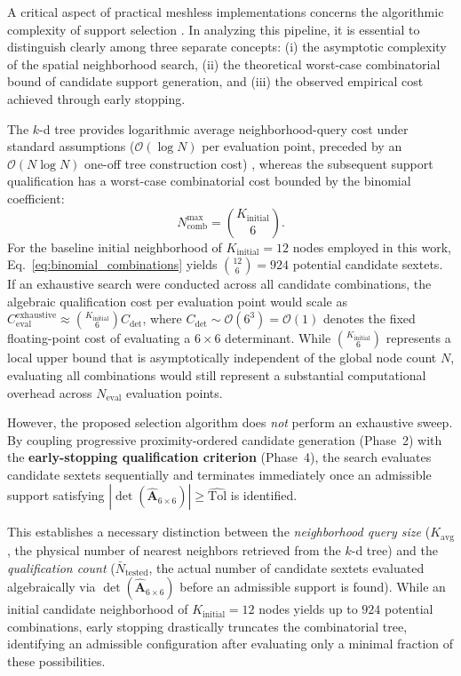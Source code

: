 \documentclass[preprint,12pt]{elsarticle}
\begin{document}
A critical aspect of practical meshless implementations concerns the algorithmic complexity of support selection \cite{slak2018refined,parreira2006efficient,wu2026high}. In analyzing this pipeline, it is essential to distinguish clearly among three separate concepts: (i) the asymptotic complexity of the spatial neighborhood search, (ii) the theoretical worst-case combinatorial bound of candidate support generation, and (iii) the observed empirical cost achieved through early stopping.

The $k$-d tree provides logarithmic average neighborhood-query cost under standard assumptions ($\mathcal{O}(\log N)$ per evaluation point, preceded by an $\mathcal{O}(N \log N)$ one-off tree construction cost) \cite{bentley1975multidimensional, parreira2006efficient, fasshauer2007meshfree,wu2026high}, whereas the subsequent support qualification has a worst-case combinatorial cost bounded by the binomial coefficient:
\begin{equation}
    N_{\mathrm{comb}}^{\mathrm{max}} = \binom{K_{\mathrm{initial}}}{6}.
    \label{eq:binomial_combinations}
\end{equation}
For the baseline initial neighborhood of $K_{\mathrm{initial}} = 12$ nodes employed in this work, Eq.~\eqref{eq:binomial_combinations} yields $\binom{12}{6} = 924$ potential candidate sextets. If an exhaustive search were conducted across all candidate combinations, the algebraic qualification cost per evaluation point would scale as $C_{\mathrm{eval}}^{\mathrm{exhaustive}} \approx \binom{K_{\mathrm{initial}}}{6} C_{\det}$, where $C_{\det} \sim \mathcal{O}(6^3) = \mathcal{O}(1)$ denotes the fixed floating-point cost of evaluating a $6 \times 6$ determinant. While $\binom{K_{\mathrm{initial}}}{6}$ represents a local upper bound that is asymptotically independent of the global node count $N$, evaluating all combinations would still represent a substantial computational overhead across $N_{\mathrm{eval}}$ evaluation points.

However, the proposed selection algorithm does \emph{not} perform an exhaustive sweep. By coupling progressive proximity-ordered candidate generation (Phase~2) with the \textbf{early-stopping qualification criterion} (Phase~4), the search evaluates candidate sextets sequentially and terminates immediately once an admissible support satisfying $|\det(\widehat{\mathbf{A}}_{6 \times 6})| \ge \widehat{\mathrm{Tol}}$ is identified.

This establishes a necessary distinction between the \emph{neighborhood query size} ($K_{\mathrm{avg}}$, the physical number of nearest neighbors retrieved from the $k$-d tree) and the \emph{qualification count} ($\bar{N}_{\mathrm{tested}}$, the actual number of candidate sextets evaluated algebraically via $\det(\widehat{\mathbf{A}}_{6\times6})$ before an admissible support is found). While an initial candidate neighborhood of $K_{\mathrm{initial}} = 12$ nodes yields up to $924$ potential combinations, early stopping drastically truncates the combinatorial tree, identifying an admissible configuration after evaluating only a minimal fraction of these possibilities.
\end{document}
